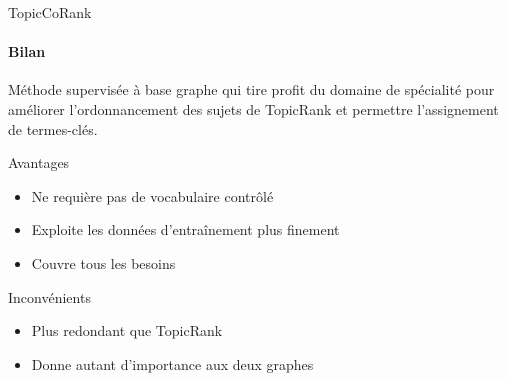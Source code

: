 \begin{frame}{TopicCoRank}\framesubtitle{Bilan}
  Méthode supervisée à base graphe qui tire profit du domaine de spécialité pour
  améliorer l'ordonnancement des sujets de TopicRank et permettre l'assignement
  de termes-clés.

  \vspace{1em}

  \begin{block}{Avantages}
    \begin{itemize}
      \item{Ne requière pas de vocabulaire contrôlé}
      \item{Exploite les données d'entraînement plus finement}
      \item{Couvre tous les besoins}
    \end{itemize}
  \end{block}

  \vspace{1em}

  \begin{alertblock}{Inconvénients}
    \begin{itemize}
      \item{Plus redondant que TopicRank}
      \item{Donne autant d'importance aux deux graphes}
    \end{itemize}
  \end{alertblock}
\end{frame}

